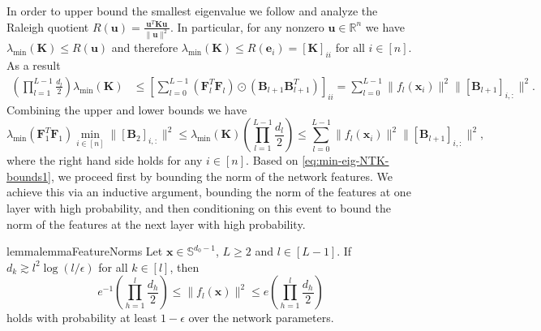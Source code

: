 \documentclass{article}
\theoremstyle{definition}
\newcommand*{\R}{\mathbb{R}}
\renewcommand{\S}{\mathbb{S}}
\def\ve{{\bm{e}}}
\def\vu{{\bm{u}}}
\def\vx{{\bm{x}}}
\def\mB{{\bm{B}}}
\def\mF{{\bm{F}}}
\def\mK{{\bm{K}}}
\begin{document}
In order to upper bound the smallest eigenvalue we follow \cite{nguyen2021tight} and analyze the Raleigh quotient $R(\vu) = \tfrac{\vu^T \mK \vu}{\| \vu\|^2}$. In particular, for any nonzero $\vu \in \R^n$ we have $\lambda_{\min}(\mK) \leq R(\vu)$ and therefore $\lambda_{\min}(\mK) \leq R(\ve_i) = [\mK]_{ii}$ for all $i \in [n]$. As a result 
\begin{align*}
     \left( \prod_{l = 1}^{L - 1} \frac{d_l}{2}\right)\lambda_{\min}(\mK) &\leq \left[ \sum_{l = 0}^{L-1} (\mF_l^T \mF_l) \odot (\mB_{l+1} \mB_{l+1}^T) \right]_{ii}    = \sum_{l=0}^{L-1} \| f_l(\vx_i) \|^2 \| [\mB_{l+1}]_{i,:} \|^2.
\end{align*}
Combining the upper and lower bounds we have 
\begin{equation} \label{eq:min-eig-NTK-bounds1}
    \lambda_{\min}\left( \mF_{1}^T \mF_{1}\right) \min_{i \in [n]} \|[\mB_2]_{i,:} \|^2 \leq \lambda_{\min}(\mK)  \left( \prod_{l = 1}^{L - 1} \frac{d_l}{2}\right) \leq \sum_{l=0}^{L-1} \| f_l(\vx_i) \|^2 \| [\mB_{l+1}]_{i,:} \|^2 , 
\end{equation}
where the right hand side holds for any $i \in [n]$. Based on \eqref{eq:min-eig-NTK-bounds1}, we proceed first by bounding the norm of the network features. We achieve this via an inductive argument, bounding the norm of the features at one layer with high probability, and then conditioning on this event to bound the norm of the features at the next layer with high probability. 

\begin{restatable}{lemma}{lemmaFeatureNorms}\label{lemma:FeatureNorms}
    Let $\vx \in \S^{d_0-1}$, $L \geq 2$ and $l \in [L-1]$. If $d_k \gtrsim l^2 \log(l/\epsilon)$ for all $k\in [l]$, then 
    \[
    e^{-1} \left( \prod_{h=1}^l \frac{d_h}{2}\right) \leq \| f_l(\vx) \|^2 \leq e \left( \prod_{h=1}^l \frac{d_h}{2}\right)
    \]
    holds with probability at least $1- \epsilon$ over the network parameters. 
\end{restatable}
\end{document}
